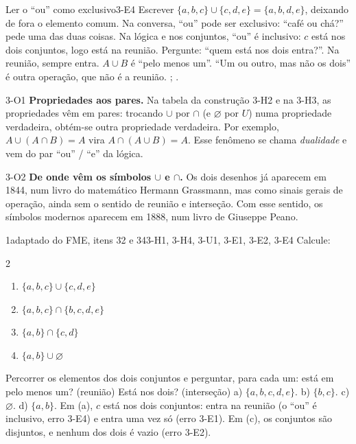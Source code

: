 \begin{erro}{Ler o \enquote{ou} como exclusivo}{3-E4}
 Escrever $\{a,b,c\}\cup\{c,d,e\}=\{a,b,d,e\}$, deixando de fora o elemento comum.
 Na conversa, \enquote{ou} pode ser exclusivo: \enquote{café ou chá?} pede uma das duas coisas.
 Na lógica e nos conjuntos, \enquote{ou} é inclusivo: $c$ está nos dois conjuntos, logo está na reunião.
 Pergunte: \enquote{quem está nos dois entra?}. Na reunião, sempre entra.
 $A\cup B$ é \enquote{pelo menos um}. \enquote{Um ou outro, mas não os dois} é outra operação, que não é a reunião.
 ; .
\end{erro}

\Observacoes

\begin{obs}{3-O1}
\textbf{Propriedades aos pares.} Na tabela da construção 3-H2 e na 3-H3, as propriedades vêm em pares: trocando $\cup$ por $\cap$ (e $\varnothing$ por $U$) numa propriedade verdadeira, obtém-se outra propriedade verdadeira. Por exemplo, $A\cup(A\cap B)=A$ vira $A\cap(A\cup B)=A$. Esse fenômeno se chama \emph{dualidade} e vem do par \enquote{ou} / \enquote{e} da lógica.
\end{obs}

\begin{obs}{3-O2}
\textbf{De onde vêm os símbolos $\cup$ e $\cap$.} Os dois desenhos já aparecem em 1844, num livro do matemático Hermann Grassmann, mas como sinais gerais de operação, ainda sem o sentido de reunião e interseção. Com esse sentido, os símbolos modernos aparecem em 1888, num livro de Giuseppe Peano.
\end{obs}

\Exemplos

\begin{exemplo}{}{1}{adaptado do FME, itens 32 e 34}{3-H1, 3-H4, 3-U1, 3-E1, 3-E2, 3-E4}
\label{ex:u3:operar}
Calcule:
\begin{multicols}{2}
\begin{enumerate}[label=\alph*)]
  \item $\{a,b,c\}\cup\{c,d,e\}$
  \item $\{a,b,c\}\cap\{b,c,d,e\}$
  \item $\{a,b\}\cap\{c,d\}$
  \item $\{a,b\}\cup\varnothing$
\end{enumerate}
\end{multicols}
\plano Percorrer os elementos dos dois conjuntos e perguntar, para cada um: está em pelo menos um? (reunião) Está nos dois? (interseção)
\resolucao a) $\{a,b,c,d,e\}$. b) $\{b,c\}$. c) $\varnothing$. d) $\{a,b\}$.
\comentario Em (a), $c$ está nos dois conjuntos: entra na reunião (o \enquote{ou} é inclusivo, erro 3-E4) e entra uma vez só (erro 3-E1). Em (c), os conjuntos são disjuntos, e nenhum dos dois é vazio (erro 3-E2).
\end{exemplo}


